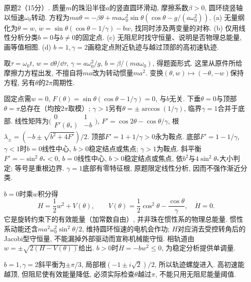 \begin{exercise}
原题2（15分）. 质量$m$的珠沿半径$a$的竖直圆环滑动, 摩擦系数$\beta>0$, 圆环绕竖轴以恒速$\omega_0$转动. 方程为$ma\ddot\theta=-\beta\dot\theta+ma\omega_0^2\sin\theta(\cos\theta-g/(a\omega_0^2))$. (a) 无量纲化为$\dot\theta=w$, $\dot w=\sin\theta(\cos\theta-1/\gamma)-bw$, 找同时涉及两变量的对称. (b) 仅用线性分析分类$b=0$与$b\ne0$的固定点. (c) 无阻尼时找守恒量、说明是否物理总能量, 画等值相图. (d) $b=1,\gamma=2$画稳定点附近轨迹与越过顶部的高初速轨迹.
\end{exercise}
\begin{solution}
取$\tau=\omega_0t$, $w=\dd\theta/\dd\tau$, $\gamma=a\omega_0^2/g$, $b=\beta/(ma\omega_0)$, 得题面形式. 这里从原件所给摩擦力方程出发, 不擅自将$ma$改为转动惯量$ma^2$. 变换$(\theta,w)\mapsto(-\theta,-w)$保持方程, 另有$\theta$的$2\pi$周期性.

固定点需$w=0$, $F(\theta)=\sin\theta(\cos\theta-1/\gamma)=0$, 与$b$无关. 下垂$\theta=0$与顶部$\theta=\pi$总存在（均按$2\pi$取模）; $\gamma>1$另有$\theta=\pm\arccos(1/\gamma)$, 临界$\gamma=1$合并于底部. 线性矩阵为$\bigl(\begin{smallmatrix}0&1\\F'(\theta_*)&-b\end{smallmatrix}\bigr)$, $F'=\cos2\theta-\cos\theta/\gamma$, 根$\lambda_\pm=(-b\pm\sqrt{b^2+4F'})/2$. 顶部$F'=1+1/\gamma>0$永为鞍点. 底部$F'=1-1/\gamma$, $\gamma<1$时$b=0$线性中心, $b>0$稳定结点或焦点; $\gamma>1$为鞍点. 斜平衡$F'=-\sin^2\theta_*<0$, $b=0$线性中心, $b>0$稳定结点或焦点, 依$b^2$与$4\sin^2\theta_*$大小判定; 等号是重根边界. $\gamma=1$底部有零特征根, 原题限定线性分析, 因而不强作渐近分类.

$b=0$时乘$w$积分得
\[
H=\frac12w^2+V(\theta),\qquad
V(\theta)=\frac12\cos^2\theta-\frac{\cos\theta}{\gamma},
\quad\dot H=0.
\]
它是旋转约束下的有效能量（加常数自由）, 并非珠在惯性系的物理总能量. 惯性系动能还含$ma^2\omega_0^2\sin^2\theta/2$, 维持圆环恒速的电机会作功; $H$对应消去受控转角后的Jacobi型守恒量, 不能漏掉外部驱动而宣称机械能守恒. 相轨道由$w=\pm\sqrt{2(H-V(\theta))}$给出. $b>0$时$\dot H=-bw^2\le0$, 为稳定分析提供单调量.

$b=1,\gamma=2$斜平衡为$\pm\pi/3$, 局部根$(-1\pm i\sqrt2)/2$, 所以轨迹螺旋进入. 高初速能越顶, 但阻尼使有效能量降低, 必须实际检查$\theta$越过$\pi$, 不能只用无阻尼能量阈值.
\end{solution}


